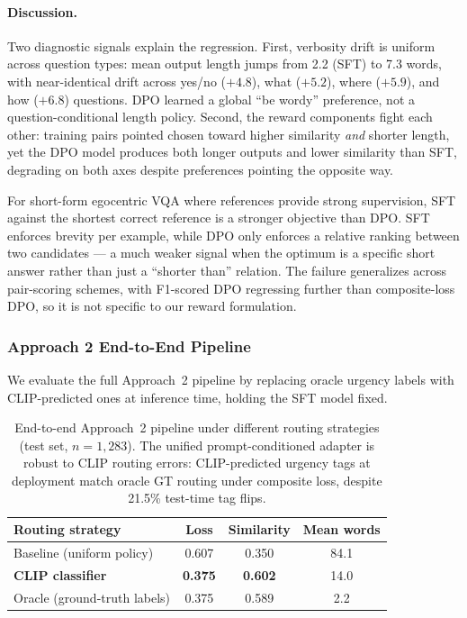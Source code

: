 \documentclass{article}
\begin{document}
\paragraph{Discussion.}
Two diagnostic signals explain the regression. First, verbosity drift is uniform across question types: mean output length jumps from 2.2 (SFT) to 7.3 words, with near-identical drift across yes/no ($+4.8$), what ($+5.2$), where ($+5.9$), and how ($+6.8$) questions. DPO learned a global ``be wordy'' preference, not a question-conditional length policy. Second, the reward components fight each other: training pairs pointed chosen toward higher similarity \emph{and} shorter length, yet the DPO model produces both longer outputs and lower similarity than SFT, degrading on both axes despite preferences pointing the opposite way.

For short-form egocentric VQA where references provide strong supervision, SFT against the shortest correct reference is a stronger objective than DPO. SFT enforces brevity per example, while DPO only enforces a relative ranking between two candidates --- a much weaker signal when the optimum is a specific short answer rather than just a ``shorter than'' relation. The failure generalizes across pair-scoring schemes, with F1-scored DPO regressing further than composite-loss DPO, so it is not specific to our reward formulation.

\subsubsection{Approach 2 End-to-End Pipeline}\label{sec:approach2_pipeline}
We evaluate the full Approach~2 pipeline by replacing oracle urgency labels with CLIP-predicted ones at inference time, holding the SFT model fixed.

\begin{table}[H]
\centering
\caption{End-to-end Approach~2 pipeline under different routing strategies (test set, $n = 1{,}283$). The unified prompt-conditioned adapter is robust to CLIP routing errors: CLIP-predicted urgency tags at deployment match oracle GT routing under composite loss, despite 21.5\% test-time tag flips.}
\label{tab:approach2_pipeline}
\begin{tabular}{lccc}
\toprule
\textbf{Routing strategy} & \textbf{Loss} & \textbf{Similarity} & \textbf{Mean words} \\
\midrule
Baseline (uniform policy)        & 0.607 & 0.350 & 84.1 \\
\textbf{CLIP classifier}        & \textbf{0.375} & \textbf{0.602} & 14.0 \\
Oracle (ground-truth labels)     & 0.375 & 0.589 &  2.2 \\
\bottomrule
\end{tabular}
\end{table}
\end{document}
